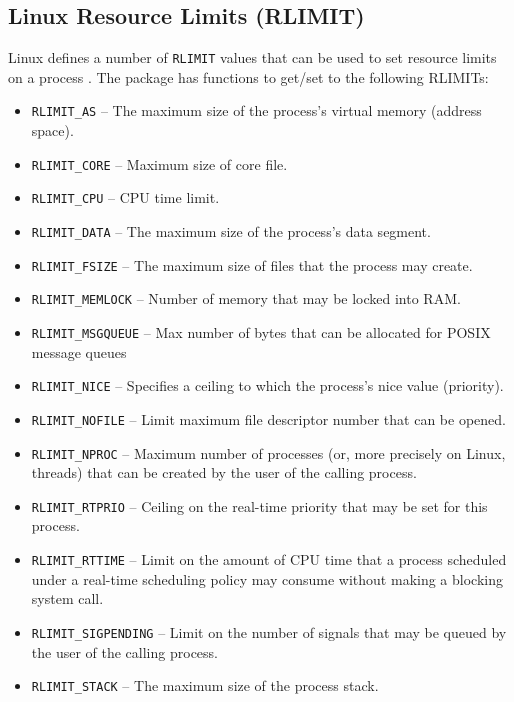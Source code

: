\documentclass{jss}
\newcommand{\RAppArmor}{\pkg{RAppArmor}\xspace}
\begin{document}
\subsection{Linux Resource Limits (RLIMIT)}
\label{RLIMITS}

Linux defines a number of \texttt{RLIMIT} values that can be used to set
resource limits on a process \citep{linuxrlimit}. The \RAppArmor package
has functions to get/set to the following RLIMITs:

\begin{itemize}
  \item \texttt{RLIMIT\_AS} -- The maximum size of the process's virtual memory
  (address space).
  \item \texttt{RLIMIT\_CORE} -- Maximum size of core file.
  \item \texttt{RLIMIT\_CPU} -- CPU time limit.
  \item \texttt{RLIMIT\_DATA} --  The maximum size of the process's data
  segment.
  \item \texttt{RLIMIT\_FSIZE} --  The maximum size of files that the process
  may create.
  \item \texttt{RLIMIT\_MEMLOCK} -- Number of memory that may be locked into
  RAM.
  \item \texttt{RLIMIT\_MSGQUEUE} -- Max number of bytes that can be allocated
  for POSIX message queues
  \item \texttt{RLIMIT\_NICE} --  Specifies a ceiling to which the process's
  nice value (priority).
  \item \texttt{RLIMIT\_NOFILE} -- Limit maximum file descriptor number that
  can be opened.
  \item \texttt{RLIMIT\_NPROC} -- Maximum number of processes (or, more
  precisely on Linux, threads) that can be created by the user of the calling
  process.
  \item \texttt{RLIMIT\_RTPRIO} -- Ceiling on the real-time priority that may be
  set for this process.
  \item \texttt{RLIMIT\_RTTIME} -- Limit on the amount of CPU time that a
  process scheduled under a real-time scheduling policy may consume without
  making a blocking system call.
  \item \texttt{RLIMIT\_SIGPENDING} -- Limit on the number of signals that may
  be queued by the user of the calling process.
  \item \texttt{RLIMIT\_STACK} -- The maximum size of the process stack.
\end{itemize}
\end{document}
